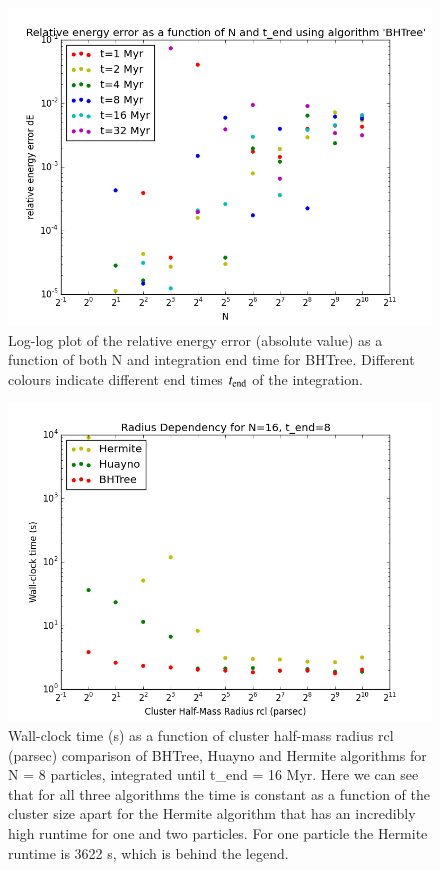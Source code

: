 \documentclass{aa}
\begin{document}
   \begin{figure}
   \centering
   \includegraphics[width=\hsize]{img/CA_GD_TLRH_s1603221_SS_s1617451_BHTree_dE_log.png}
      \caption{Log-log plot of the relative energy error (absolute value) as a function of both N and integration 
               end time for BHTree. Different colours indicate different end times $t_{\rm end}$ of the integration.
              }
         \label{fig:BHTree_dE}
   \end{figure}
     
   \begin{figure}
   \centering
   \includegraphics[width=\hsize]{img/CA_GD_TLRH_s1603221_SS_s1617451_rcldep_N16_t-end8.png}
      \caption{Wall-clock time (s) as a function of cluster half-mass radius rcl (parsec) comparison of
      	      BHTree, Huayno and Hermite algorithms for N = 8 particles, integrated until t\_end = 16 Myr.
	      Here we can see that for all three algorithms the time is constant as a function of the cluster size apart for the Hermite
	      algorithm that has an incredibly high runtime for one and two particles. For one particle the Hermite runtime is 3622 s, which is behind the legend. 
              }
         \label{fig:radius_dependency}
   \end{figure}  
\end{document}
